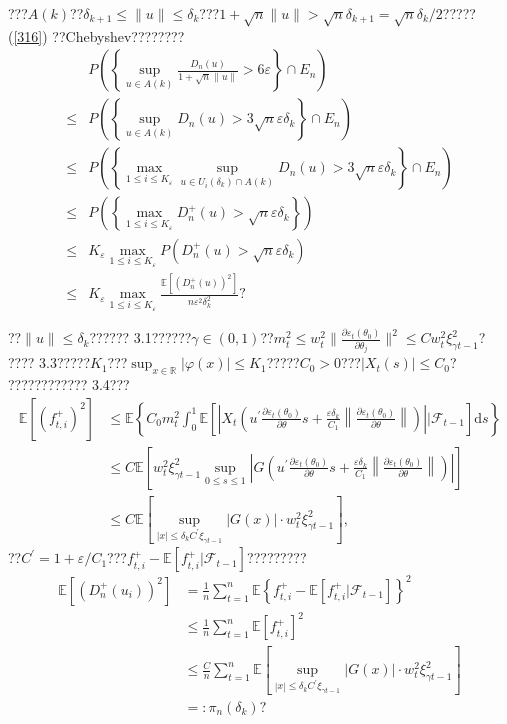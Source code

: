 \documentclass[a4paper,12pt,openany,oneside,utf-8]{ctexbook}
\begin{document}
	\noindent ???$A(k)$??$\delta_{k+1}\le\|u\|\le\delta_k$???$1+\sqrt{n}\|u\|>\sqrt{n}\delta_{k+1}=\sqrt{n}\delta_{k}/2$?????(\ref{316}) ??Chebyshev????????
	\begin{align}\label{317}
		&P\left(\left\{\sup_{u\in A(k)}\frac{D_n(u)}{1+\sqrt{n}\|u\|}>6\varepsilon\right\}\cap E_n\right)\nonumber\\
		\le &P\left(\left\{\sup_{u\in A(k)}D_n(u)>3\sqrt{n}\varepsilon\delta_k\right\}\cap E_n\right)\nonumber\\
		\le &P\left(\left\{\max_{1\le i\le K_{\varepsilon}}\sup_{u\in U_i(\delta_k)\cap A(k)}D_n(u)>3\sqrt{n}\varepsilon\delta_k\right\}\cap E_n\right)\nonumber\\
		\le &P\left(\left\{\max_{1\le i\le K_{\varepsilon}}D_n^{+}(u)>\sqrt{n}\varepsilon\delta_k\right\}\right)\nonumber\\
		\le &K_{\varepsilon}\max_{1\le i\le K_{\varepsilon}}P(D_n^{+}(u)>\sqrt{n}\varepsilon\delta_k)\nonumber\\
		\le &K_{\varepsilon}\max_{1\le i\le K_{\varepsilon}}\frac{\mathbb{E}[(D_n^{+}(u))^2]}{n\varepsilon^2\delta_k^2}\mbox{?}
	\end{align}
	
	\noindent ??$\|u\|\le\delta_k$?????? 3.1??????$\gamma\in(0,1)$??$m_t^2\le w_t^2\|\frac{\partial\varepsilon_t(\theta_0)}{\partial\theta_j}\|^2\le Cw_t^2\xi^2_{\gamma t-1}$? ???? 3.3?????$K_1$???$\sup_{x\in\mathbb{R}}|\varphi(x)|\le K_1$?????$C_0>0$???$|X_t(s)|\le C_0$? ???????????? 3.4???
	\begin{align}
		\mathbb{E}\left[(f_{t,i}^{+})^2\right]&\le\mathbb{E}\left\{C_0m_t^2\int_0^1\mathbb{E}\left[\left|X_t\left(u^{\prime}\frac{\partial\varepsilon_t(\theta_0)}{\partial\theta}s+\frac{\varepsilon\delta_k}{C_1}\left\|\frac{\partial\varepsilon_t(\theta_0)}{\partial\theta}\right\|\right)\right||\mathcal{F}_{t-1}\right]\mathrm{d}s\right\}\nonumber\\
		&\le C\mathbb{E}\left[w_t^2\xi^2_{\gamma t-1}\sup_{0\le s\le1}\left|G\left(u^{\prime}\frac{\partial\varepsilon_t(\theta_0)}{\partial\theta}s+\frac{\varepsilon\delta_k}{C_1}\left\|\frac{\partial\varepsilon_t(\theta_0)}{\partial\theta}\right\|\right)\right|\right]\nonumber\\
		&\le C\mathbb{E}\left[\sup_{|x|\le\delta_kC^{\prime}\xi_{\gamma t-1}}|G(x)|\cdot w_t^2\xi^2_{\gamma t-1}\right],\nonumber
	\end{align}
	??$C^{\prime}=1+\varepsilon/C_1$???$f_{t,i}^{+}-\mathbb{E}[f_{t,i}^{+}|\mathcal{F}_{t-1}]$?????????
	\begin{align}\label{318}
		\mathbb{E}\left[(D_n^{+}(u_i))^2\right]&=\frac{1}{n}\sum_{t=1}^n\mathbb{E}\left\{f_{t,i}^{+}-\mathbb{E}[f_{t,i}^{+}|\mathcal{F}_{t-1}]\right\}^2\nonumber\\
		&\le \frac{1}{n}\sum_{t=1}^n\mathbb{E}\left[f_{t,i}^{+}\right]^2\nonumber\\
		&\le \frac{C}{n}\sum_{t=1}^n\mathbb{E}\left[\sup_{|x|\le\delta_kC^{\prime}\xi_{\gamma t-1}}|G(x)|\cdot w_t^2\xi^2_{\gamma t-1}\right]\nonumber\\
		&=:\pi_n(\delta_k)\mbox{?}
	\end{align}
	
\end{document}
